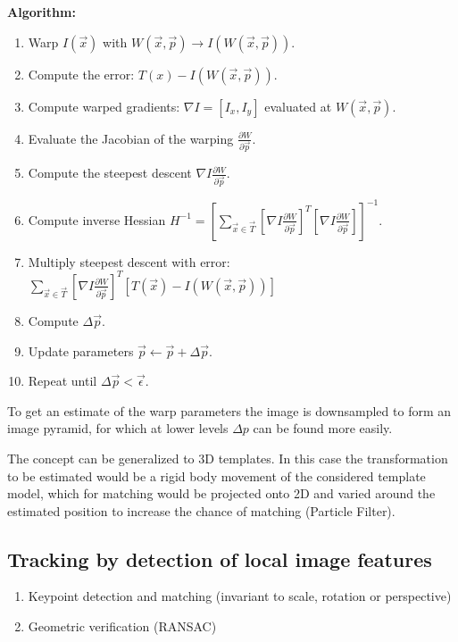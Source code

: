 \documentclass[10pt,a4paper]{scrartcl}
\begin{document}
\begin{multicols*}{2}
\textbf{Algorithm:}
\begin{enumerate}
\item Warp $I(\vec{x})$ with $W(\vec{x},\vec{p})\rightarrow I(W(\vec{x},\vec{p}))$.
\item Compute the error: $T(x)-I(W(\vec{x},\vec{p}))$.
\item Compute warped gradients: $\nabla I=\left[I_x,I_y\right]$ evaluated at $W(\vec{x},\vec{p})$.
\item Evaluate the Jacobian of the warping $\frac{\partial W}{\partial \vec{p}}$.
\item Compute the steepest descent $\nabla I\frac{\partial W}{\partial\vec{p}}$.
\item Compute inverse Hessian $H^{-1}=\left[\sum\limits_{\vec{x}\in\vec{T}}\left[\nabla I\frac{\partial W}{\partial \vec{p}}\right]^T\left[\nabla I\frac{\partial W}{\partial\vec{p}}\right]\right]^{-1}$.
\item Multiply steepest descent with error: $\sum\limits_{\vec{x}\in\vec{T}}\left[\nabla I\frac{\partial W}{\partial\vec{p}}\right]^T\left[T(\vec{x})-I(W(\vec{x},\vec{p}))\right]$
\item Compute $\Delta \vec{p}$.
\item Update parameters $\vec{p}\leftarrow \vec{p}+\Delta\vec{p}$.
\item Repeat until $\Delta\vec{p}<\vec{\epsilon}$.
\end{enumerate}


To get an estimate of the warp parameters the image is downsampled to form an image pyramid, for which at lower levels $\Delta p$ can be found more easily.


The concept can be generalized to 3D templates. In this case the transformation to be estimated would be a rigid body movement of the considered template model, which for matching would be projected onto 2D and varied around the estimated position to increase the chance of matching (Particle Filter).

\subsection{Tracking by detection of local image features}

\begin{enumerate}
\item Keypoint detection and matching (invariant to scale, rotation or perspective)
\item Geometric verification (RANSAC)
\end{enumerate}


\end{multicols*}
\end{document}
